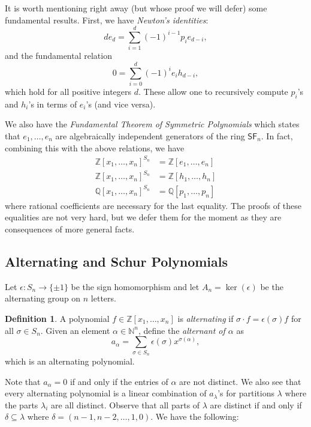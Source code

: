 \documentclass[12pt]{article}
\theoremstyle{plain}
\theoremstyle{definition}
\newtheorem{definition}[theorem]{Definition}
\theoremstyle{remark}
\numberwithin{equation}{section}
\begin{document}
It is worth mentioning right away (but whose proof we will defer)
some fundamental results.  First, we have \emph{Newton's identities}:
\[
de_d = \sum_{i=1}^d (-1)^{i-1} p_i e_{d-i} ,
\]
and the fundamental relation
\[
0 = \sum_{i=0}^d (-1)^i e_i h_{d-i},
\]
which hold for all positive integers $d$.
These allow one to recursively compute $p_i$'s and $h_i$'s in terms
of $e_i$'s (and vice versa).

We also have the \emph{Fundamental Theorem of Symmetric
Polynomials} which states that $e_1,\ldots,e_n$ are algebraically independent
generators of the ring $\mathsf{SF}_n$.
In fact, combining this with the above relations, we have
\begin{align*}
\mathbb{Z}[x_1,\ldots,x_n]^{S_n} &= \mathbb{Z}[e_1,\ldots,e_n]\\
\mathbb{Z}[x_1,\ldots,x_n]^{S_n} &= \mathbb{Z}[h_1,\ldots,h_n]\\
\mathbb{Q}[x_1,\ldots,x_n]^{S_n} &= \mathbb{Q}[p_1,\ldots,p_n]
\end{align*}
where rational coefficients are necessary for the last equality.
The proofs of these equalities are not very hard, but we defer them for
the moment as they are consequences of more general facts.

\subsection{Alternating and Schur Polynomials}

Let $\epsilon : S_n \to \{\pm 1\}$ be the sign homomorphism
and let $A_n = \ker(\epsilon)$ be the alternating group on $n$ letters.

\begin{definition}
A polynomial $f \in \mathbb{Z}[x_1,\ldots,x_n]$ is \emph{alternating} if
$\sigma \cdot f = \epsilon(\sigma)f$ for all $\sigma \in S_n$.
Given an element $\alpha \in \mathbb{N}^n$, define the \emph{alternant
of $\alpha$} as
\[
a_\alpha = \sum_{\sigma \in S_n} \epsilon(\sigma) x^{\sigma(\alpha)},
\]
which is an alternating polynomial.
\end{definition}

Note that $a_\alpha=0$ if and only if the entries of $\alpha$ are
not distinct.  We also see that every alternating polynomial is a linear
combination of $a_\lambda$'s for partitions $\lambda$ where the parts
$\lambda_i$ are all distinct.
Observe that all parts of $\lambda$ are distinct if and only if
$\delta \subseteq \lambda$ where
$\delta=(n-1,n-2,\ldots,1,0)$.
We have the following:
\end{document}
